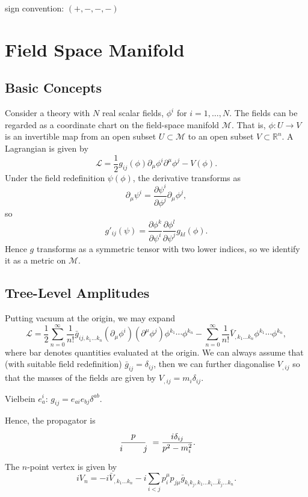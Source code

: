\documentclass[11pt]{article}
\theoremstyle{definition}
\theoremstyle{remark}
\begin{document}
sign convention: $(+,-,-,-)$
\section{Field Space Manifold}
\subsection{Basic Concepts}
Consider a theory with $N$ real scalar fields, $\phi^{i}$ for $i=1,\dots,N$.
The fields can be regarded as a coordinate chart on the field-space manifold $\mathcal{M}$.
That is, $\phi:U\to V$ is an invertible map from an open subset $U\subset\mathcal{M}$ to an open subset $V\subset\mathbb{R}^{n}$.
A Lagrangian is given by
\[\mathcal{L}=\frac{1}{2}g_{ij}(\phi)\partial_{\mu}\phi^{i}\partial^{\mu}\phi^{j}-V(\phi).\]
Under the field redefinition $\psi(\phi)$, the derivative transforms as
\[\partial_{\mu}\psi^{i}=\frac{\partial\psi^{i}}{\partial\phi^{j}}\partial_{\mu}\phi^{j},\]
so
\[g'_{ij}(\psi)=\frac{\partial\phi^{k}}{\partial\psi^{i}}\frac{\partial\phi^{l}}{\partial\psi^{j}}g_{kl}(\phi).\]
Hence $g$ transforms as a symmetric tensor with two lower indices, so we identify it as a metric on $\mathcal{M}$.

\subsection{Tree-Level Amplitudes}
Putting vacuum at the origin, we may expand
\[\mathcal{L}=\frac{1}{2}\sum_{n=0}^{\infty}\frac{1}{n!}\bar{g}_{ij,k_{1}\dots k_{n}}(\partial_{\mu}\phi^{i})(\partial^{\mu}\phi^{j})\phi^{k_{1}}\cdots\phi^{k_{n}}-\sum_{n=0}^{\infty}\frac{1}{n!}\bar{V}_{,k_{1}\dots k_{n}}\phi^{k_{1}}\cdots\phi^{k_{n}},\]
where bar denotes quantities evaluated at the origin.
We can always assume that (with suitable field redefinition) $\bar{g}_{ij}=\delta_{ij}$, then we can further diagonalise $V_{,ij}$ so that the masses of the fields are given by $V_{,ij}=m_{i}\delta_{ij}$.

Vielbein $e_{a}^{i}$: $g_{ij}=e_{ai}e_{bj}\delta^{ab}$.

Hence, the propagator is
\[\begin{tikzpicture}[baseline={-height("$\vcenter{}$")}]
	\draw (0,0) -- (1,0);
	\node at (0,0) [below] {$i$};
	\node at (1,0) [below] {$j$};
	\node at (0.5,0) [above] {$p$};
\end{tikzpicture}=\frac{i\delta_{ij}}{p^{2}-m_{i}^{2}}.\]
The $n$-point vertex is given by
\[iV_{n}=-i\bar{V}_{,k_{1}\dots k_{n}}-i\sum_{i<j}p_{i}^{\mu}p_{j\mu}\bar{g}_{k_{i}k_{j},k_{1}\dots\hat{k}_{i}\dots\hat{k}_{j}\dots k_{n}}.\]
\end{document}
